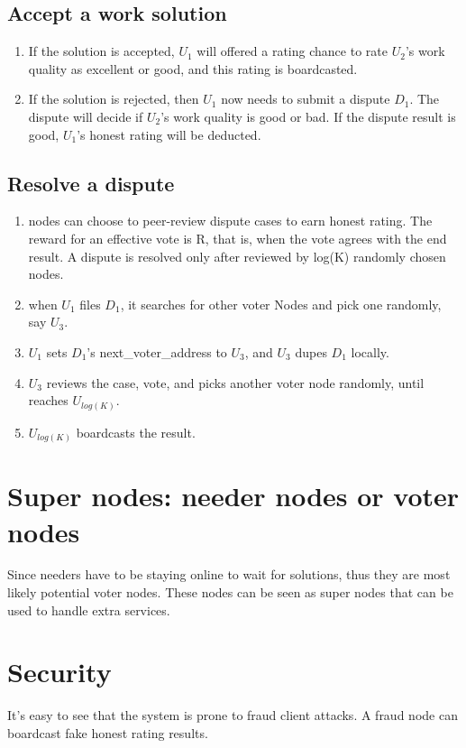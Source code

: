 \documentclass[12pt]{article}
\begin{document}
\subsection{Accept a work solution}
\begin{enumerate}
	\item If the solution is accepted, $U_1$ will offered a rating chance to rate $U_2$'s work quality as excellent or good, and this rating is boardcasted.
	\item If the solution is rejected, then $U_1$ now needs to submit a dispute $D_1$. The dispute will decide if $U_2$'s work quality is good or bad. If the dispute result is good, $U_1$'s honest rating will be deducted. 
\end{enumerate}

\subsection{Resolve a dispute}
\begin{enumerate}
	\item nodes can choose to peer-review dispute cases to earn honest rating. The reward for an effective vote is R, that is, when the vote agrees with the end result. A dispute is resolved only after reviewed by log(K) randomly chosen nodes.
	\item when $U_1$ files $D_1$, it searches for other voter Nodes and pick one randomly, say $U_3$. 
	\item $U_1$ sets $D_1$'s next\_voter\_address to $U_3$, and $U_3$ dupes $D_1$ locally. 
	\item $U_3$ reviews the case, vote, and picks another voter node randomly, until reaches $U_{log(K)}$.
	\item $U_{log(K)}$ boardcasts the result.
\end{enumerate}

\section{Super nodes: needer nodes or voter nodes}
Since needers have to be staying online to wait for solutions, thus they are most likely potential voter nodes. These nodes can be seen as super nodes that can be used to handle extra services.

\section{Security}
It's easy to see that the system is prone to fraud client attacks. A fraud node can boardcast fake honest rating results. 

\begin{thebibliography}{9}
\end{thebibliography}

	
\end{document}
